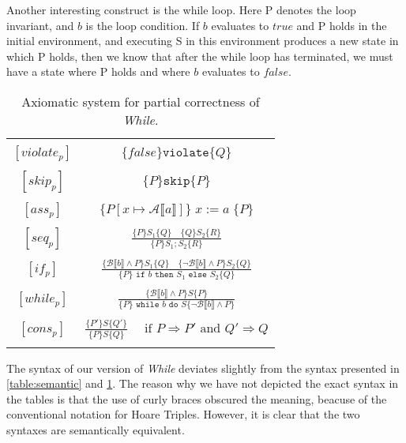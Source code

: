 Another interesting construct is the while loop.
Here P denotes the loop invariant, and $b$ is the loop condition.
If $b$ evaluates to $true$ and P holds in the initial environment, and executing S in this environment produces a new state in which P holds, then we know that after the while loop has terminated, we must have a state where P holds and where $b$ evaluates to $false$.

\begin{table}[h!]
\centering
\begin{tabular}{|c c|} 
 \hline
	& \\
 $[violate_p ]$ & $\{ false \} \texttt{violate} \{ Q \}$ \\ 
	& \\
 $[skip_p ]$ & $\{ P \} \texttt{skip} \{ P \}$ \\ 
	& \\
 $[ass_p ]$ & $\{ P[x \mapsto \mathcal{A} \llbracket a \rrbracket ] \} \; x := a \; \{ P \}$ \\ 
	& \\
 $[seq_p ]$ & 
		$\frac{\{ P \} S_1 \{Q \} \quad \{ Q\} S_2 \{ R \}}{\{ P \} S_1;S_2 \{ R \}}$ \\ 
	& \\
 $[if_p ]$ & 
		$\frac{ \{\mathcal{B} \llbracket b \rrbracket \land P \} S_1 \{ Q \} \quad 
           \{ \neg \mathcal{B} \llbracket b \rrbracket \land P\} S_2 \{ Q \} }
          {\{P\} \texttt{ if } b \texttt{ then } S_1 \texttt{ else } S_2 \{Q\}}$ \\
	& \\
 $[while_p ]$ & 
		$\frac{ \{\mathcal{B} \llbracket b \rrbracket \land P \} S \{ P \}}
          {\{P\} \texttt{ while } b \texttt{ do } S 
           \{\neg \mathcal{B} \llbracket b \rrbracket \land P\}}$ \\
	& \\
 $[cons_p ]$ & 
		$\frac{ \{P'\} S \{Q'\}}{\{P\} S \{Q\}} \quad 
     \text{ if } P \Rightarrow P' \text{ and } Q' \Rightarrow Q $ \\
	& \\
 \hline
\end{tabular}
\caption{Axiomatic system for partial correctness of \textit{While}.\cite{nielson}}
\label{table:axiomatic}
\end{table}

The syntax of our version of \textit{While} deviates slightly from the syntax presented in \cref{table:semantic} and \cref{table:axiomatic}.
The reason why we have not depicted the exact syntax in the tables is that the use of curly braces obscured the meaning, beacuse of the conventional notation for Hoare Triples.
However, it is clear that the two syntaxes are semantically equivalent. 


